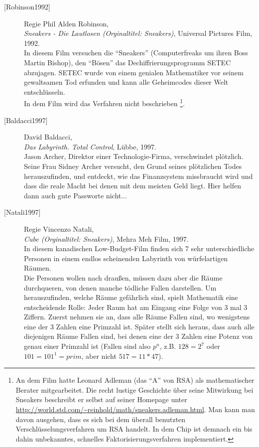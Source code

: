 \begin{description}
\item[\textrm{[Robinson1992]}] 
    Regie Phil Alden Robinson, \\
    {\em Sneakers - Die Lautlosen (Orginaltitel: Sneakers)},
    Universal Pictures Film, 1992. \\
    In diesem Film versuchen die "`Sneakers"' (Computerfreaks um ihren Boss
    Martin Bishop), den "`Bösen"' das Dechiffrierungsprogramm SETEC abzujagen.
    SETEC wurde von einem genialen Mathematiker vor seinem gewaltsamen Tod
    erfunden und kann alle Geheimcodes dieser Welt entschlüsseln.\\
    In dem Film wird das Verfahren nicht beschrieben%
    \footnote{
       An dem Film hatte Leonard Adleman (das "`A"' von RSA) als mathematischer
       Berater mitgearbeitet. Die recht lustige Geschichte über seine Mitwirkung
       bei Sneakers beschreibt er selbst auf seiner Homepage unter
       \url{http://world.std.com/~reinhold/math/sneakers.adleman.html}.
       Man kann man davon ausgehen, dass es sich bei dem überall benutzten
       Verschlüsselungsverfahren um RSA handelt.
       In dem Chip ist demnach ein bis dahin unbekanntes, schnelles
       Faktorisierungsverfahren implementiert.
    }.\\


\item[\textrm{[Baldacci1997]}] 
    David Baldacci, \\
    {\em Das Labyrinth. Total Control}, Lübbe, 1997. \\
    Jason Archer, Direktor einer Technologie-Firma, verschwindet plötzlich.
    Seine Frau Sidney Archer versucht, den Grund seines plötzlichen Todes
    herauszufinden, und entdeckt, wie das Finanzsystem missbraucht wird und
    dass die reale Macht bei denen mit dem meisten Geld liegt. Hier helfen
    dann auch gute Passworte nicht...\\


\item[\textrm{[Natali1997]}] 
    Regie Vincenzo Natali, \\
    {\em Cube (Orginaltitel: Sneakers)},
    Mehra Meh Film, 1997. \\
    In diesem kanadischen Low-Budget-Film finden sich 7 sehr unterschiedliche
    Personen in einem endlos scheinenden Labyrinth von würfelartigen Räumen.\\
    Die Personen wollen nach draußen, müssen dazu aber die Räume durchqueren,
    von denen manche tödliche Fallen darstellen. Um herauszufinden, welche
    Räume gefährlich sind, spielt Mathematik eine entscheidende Rolle: Jeder
    Raum hat am Eingang eine Folge von 3 mal 3 Ziffern. Zuerst nehmen
    sie an, dass alle Räume Fallen sind, wo wenigstens eine der 3 Zahlen eine
    Primzahl ist. Später stellt sich heraus, dass auch alle diejenigen Räume
    Fallen sind, bei denen eine der 3 Zahlen eine Potenz von genau einer
    Primzahl ist (Fallen sind also $p^n$, z.B. $128=2^7$ oder
    $101 = 101^1 = prim$, aber nicht $517 = 11*47$).\\



\end{description}
